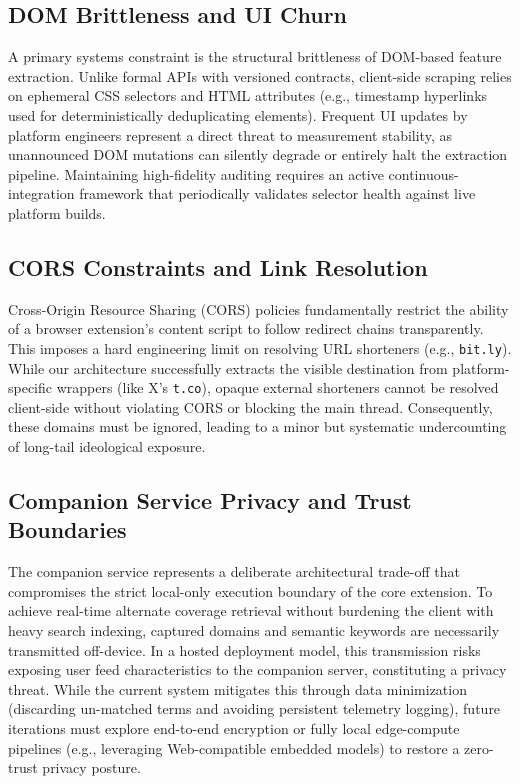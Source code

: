 \documentclass[10pt, conference, compsoc]{IEEEtran}
\begin{document}
\subsection{DOM Brittleness and UI Churn}
A primary systems constraint is the structural brittleness of DOM-based feature extraction. Unlike formal APIs with versioned contracts, client-side scraping relies on ephemeral CSS selectors and HTML attributes (e.g., timestamp hyperlinks used for deterministically deduplicating elements). Frequent UI updates by platform engineers represent a direct threat to measurement stability, as unannounced DOM mutations can silently degrade or entirely halt the extraction pipeline. Maintaining high-fidelity auditing requires an active continuous-integration framework that periodically validates selector health against live platform builds.

\subsection{CORS Constraints and Link Resolution}
Cross-Origin Resource Sharing (CORS) policies fundamentally restrict the ability of a browser extension's content script to follow redirect chains transparently. This imposes a hard engineering limit on resolving URL shorteners (e.g., \texttt{bit.ly}). While our architecture successfully extracts the visible destination from platform-specific wrappers (like X's \texttt{t.co}), opaque external shorteners cannot be resolved client-side without violating CORS or blocking the main thread. Consequently, these domains must be ignored, leading to a minor but systematic undercounting of long-tail ideological exposure.

\subsection{Companion Service Privacy and Trust Boundaries}
The companion service represents a deliberate architectural trade-off that compromises the strict local-only execution boundary of the core extension. To achieve real-time alternate coverage retrieval without burdening the client with heavy search indexing, captured domains and semantic keywords are necessarily transmitted off-device. In a hosted deployment model, this transmission risks exposing user feed characteristics to the companion server, constituting a privacy threat. While the current system mitigates this through data minimization (discarding un-matched terms and avoiding persistent telemetry logging), future iterations must explore end-to-end encryption or fully local edge-compute pipelines (e.g., leveraging Web-compatible embedded models) to restore a zero-trust privacy posture.
\end{document}
